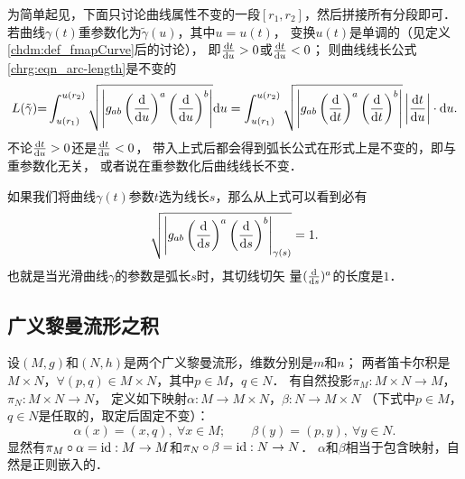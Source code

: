 为简单起见，下面只讨论曲线属性不变的一段$[r_1,r_2]$，然后拼接所有分段即可．
若曲线$\gamma(t)$重参数化为$\tilde{\gamma}(u)$，其中$u=u(t)$，
变换$u(t)$是单调的（见定义\ref{chdm:def_fmapCurve}后的讨论），
即$\frac{{\rm d} t }{{\rm d} u}>0$或$\frac{{\rm d} t }{{\rm d} u}<0$；
则曲线线长公式\eqref{chrg:eqn_arc-length}是不变的
\setlength{\mathindent}{0em}
\begin{align*}
    L(\tilde{\gamma}){=}\int_{u(r_1)}^{u(r_2)} \sqrt{\left| g_{ab} \left(\frac{{\rm d}  }
        {{\rm d} u}\right)^a\left(\frac{{\rm d}  }{{\rm d} u}\right)^b \right|} {\rm d}u
    =\int_{u(r_1)}^{u(r_2)} \sqrt{\left| g_{ab} \left(\frac{{\rm d}  }
        {{\rm d} t}\right)^a\left(\frac{{\rm d}  }{{\rm d} t}\right)^b\right|}
    \left|\frac{{\rm d} t }{{\rm d} u}\right| \cdot {\rm d}u .
\end{align*}\setlength{\mathindent}{2em}
不论$\frac{{\rm d} t }{{\rm d} u}>0$还是$\frac{{\rm d} t }{{\rm d} u}<0$，
带入上式后都会得到弧长公式在形式上是不变的，即与重参数化无关，
或者说在重参数化后曲线线长不变．

如果我们将曲线$\gamma(t)$参数$t$选为线长$s$，那么从上式可以看到必有
\begin{equation}\label{chrg:eqn_arc-unit}
    \sqrt{\left| g_{ab} \left(\frac{{\rm d}  } {{\rm d} s}\right)^a
        \left(\frac{{\rm d}  }{{\rm d} s}\right)^b \right|_{\gamma(s)}} = 1.
\end{equation}
也就是当光滑曲线$\gamma$的参数是弧长$s$时，其切线切矢
量$(\frac{{\rm d}  }{{\rm d} s})^a$的长度是$1$．

\subsection{广义黎曼流形之积}
设$(M,g)$和$(N,h)$是两个广义黎曼流形，维数分别是$m$和$n$；
两者笛卡尔积是$M\times N$，$\forall(p,q)\in M\times N$，其中$p\in M$，$q\in N$．
有自然投影$\pi_M: M\times N\to M$，$\pi_N: M\times N\to N$，
定义如下映射$\alpha:M\to M\times N$，$\beta:N\to M\times N$
（下式中$p\in M$，$q\in N$是任取的，取定后固定不变）：
\begin{equation}
    \alpha(x)=(x,q),\ \forall x \in M; \qquad  \beta(y)=(p,y),\ \forall y \in N .
\end{equation}
显然有$\pi_M \circ \alpha = {\rm id}: M\to M$和$\pi_N \circ \beta = {\rm id}: N\to N$．
$\alpha$和$\beta$相当于包含映射，自然是正则嵌入的．

